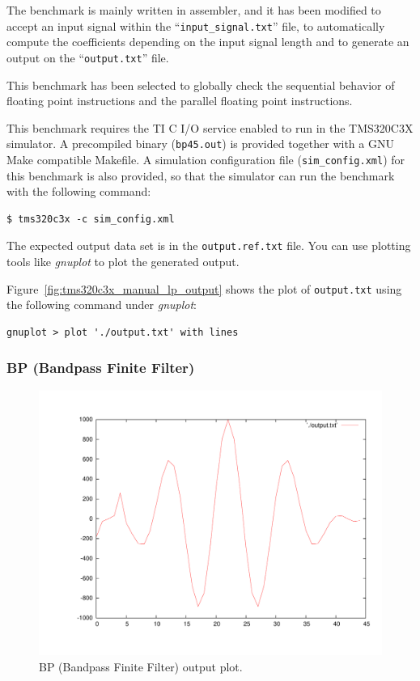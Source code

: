The benchmark is mainly written in assembler, and it has been modified to accept an input signal within the ``\texttt{input\_signal.txt}'' file, to automatically compute the coefficients depending on the input signal length and to generate an output on the ``\texttt{output.txt}'' file.

This benchmark has been selected to globally check the sequential behavior of floating point instructions and the parallel floating point instructions.

This benchmark requires the TI C I/O service enabled to run in the TMS320C3X simulator.
A precompiled binary (\texttt{bp45.out}) is provided together with a GNU Make compatible Makefile.
A simulation configuration file (\texttt{sim\_config.xml}) for this benchmark is also provided, so that the simulator can run the benchmark with the following command:
  
\begin{verbatim}
$ tms320c3x -c sim_config.xml
\end{verbatim}

The expected output data set is in the \texttt{output.ref.txt} file.
You can use plotting tools like \textit{gnuplot} to plot the generated output. 

Figure~\ref{fig:tms320c3x_manual_lp_output} shows the plot of \texttt{output.txt} using the following command under \textit{gnuplot}:

\begin{verbatim}
gnuplot > plot './output.txt' with lines
\end{verbatim}

\subsubsection{BP (Bandpass Finite Filter)}
\label{tms320c3x_sec:benchmarks_bp}

\begin{figure}[!h]
	\begin{center}
		\includegraphics[width=.8\textwidth]{tms320c3x/fig_bp_output.pdf}
		\caption{\label{fig:tms320c3x_manual_bp_output} BP (Bandpass Finite Filter) output plot.}
	\end{center}
\end{figure}

